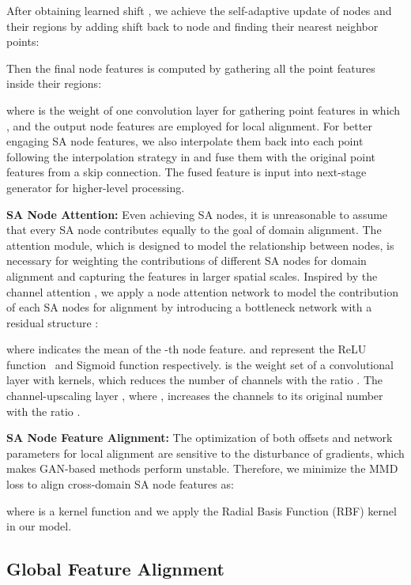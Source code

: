 \documentclass{article}
\begin{document}
After obtaining learned shift , we achieve the self-adaptive update of nodes and their regions by adding shift back to node  and finding their  nearest neighbor points:




Then the final node features  is computed by gathering all the point features inside their regions:

where  is the weight of one convolution layer for gathering point features in which , and the output node features are employed for local alignment. For better engaging SA node features, we also interpolate them back into each point following the interpolation strategy in \cite{qi2017pointnet++} and fuse them with the original point features from a skip connection. The fused feature is input into next-stage generator for higher-level processing.

\textbf{SA Node Attention: }Even achieving SA nodes, it is unreasonable to assume that every SA node contributes equally to the goal of domain alignment. The attention module, which is designed to model the relationship between nodes, is necessary for weighting the contributions of different SA nodes for domain alignment and capturing the features in larger spatial scales. Inspired by the channel attention \cite{zhang2018rcan}, we apply a node attention network to model the contribution of each SA nodes for alignment by introducing a bottleneck network with a residual structure \cite{he2016deep}:

where  indicates the mean of the -th node feature.  and  represent the ReLU function~\cite{nair2010rectified} and Sigmoid function respectively.  is the weight set of a convolutional layer with  kernels, which reduces the number of channels with the ratio . The channel-upscaling layer , where , increases the channels to its original number with the ratio .






\textbf{SA Node Feature Alignment:} 
The optimization of both offsets and network parameters for local alignment are sensitive to the disturbance of gradients, which makes GAN-based methods perform unstable. Therefore, we minimize the MMD~\cite{borgwardt2006integrating,long2013transfer} loss to align cross-domain SA node features as:

where  is a kernel function and we apply the Radial Basis Function (RBF) kernel in our model.

\subsection{Global Feature Alignment}
\end{document}
